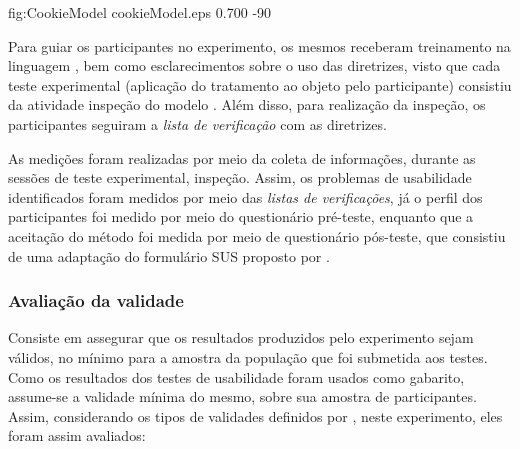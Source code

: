        {fig:CookieModel}
       {cookieModel.eps}
       {0.700}
       {-90}

Para  guiar  os  participantes  no experimento,  os  mesmos  receberam
treinamento na linguagem \aladim, bem como esclarecimentos sobre o uso
das  diretrizes,  visto  que  cada teste  experimental  (aplicação  do
tratamento  ao  objeto   pelo  participante)  consistiu  da  atividade
inspeção do modelo \aladim.   Além disso, para realização da inspeção,
os  participantes  seguiram  a  {\em  lista  de  verificação}  com  as
diretrizes.

As  medições  foram realizadas  por  meio  da  coleta de  informações,
durante  as  sessões  de  teste  experimental,  inspeção.   Assim,  os
problemas de usabilidade identificados foram medidos por meio das {\em
  listas de  verificações}, já o  perfil dos participantes  foi medido
por meio do questionário pré-teste, enquanto que a aceitação do método
foi medida  por meio de  questionário pós-teste, que consistiu  de uma
adaptação do formulário SUS proposto por .


\subsubsection{Avaliação da validade}
\label{validityEvaluation}

Consiste em  assegurar que  os resultados produzidos  pelo experimento
sejam válidos, no mínimo para a amostra da população que foi submetida
aos testes. Como os resultados  dos testes de usabilidade foram usados
como gabarito, assume-se a validade mínima do mesmo, sobre sua amostra
de participantes.  Assim, considerando os tipos de validades definidos
por , neste experimento, eles foram assim
avaliados:


